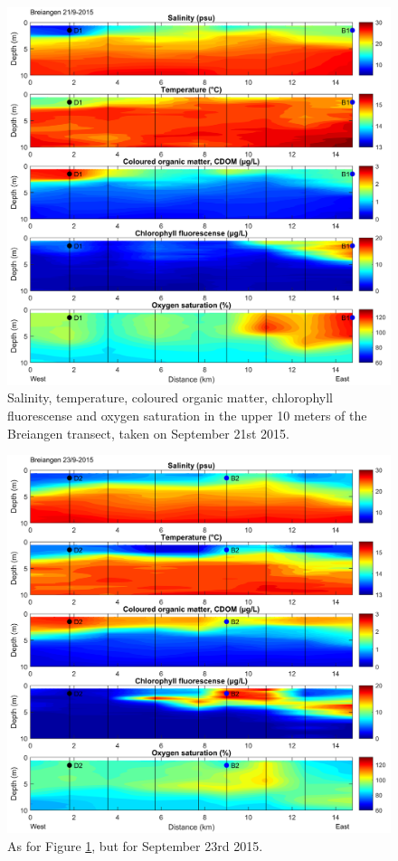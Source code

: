 \documentclass[12pt,a4paper,english]{article}
\begin{document}
\begin{figure}[ht]
\centerline{
\includegraphics*[width=\textwidth]{Figurer/Breiangen_21_09_2015_v2.png}}
\caption{\small
Salinity, temperature, coloured organic matter, chlorophyll fluorescense and oxygen saturation in the upper 10 meters of the Breiangen transect, taken on September 21st 2015.}
\label{fig:brei1}
\end{figure}

\begin{figure}[ht]
\centerline{
\includegraphics*[width=\textwidth]{Figurer/Breiangen_23_09_2015_v2.png}}
\caption{\small
As for Figure \ref{fig:brei1}, but for September 23rd 2015.}
\label{fig:brei2}
\end{figure}
\end{document}

